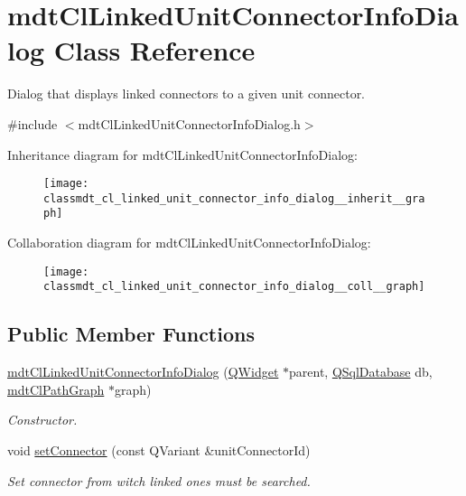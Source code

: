 \hypertarget{classmdt_cl_linked_unit_connector_info_dialog}{\section{mdt\-Cl\-Linked\-Unit\-Connector\-Info\-Dialog Class Reference}
\label{classmdt_cl_linked_unit_connector_info_dialog}
}


Dialog that displays linked connectors to a given unit connector.  




{\ttfamily \#include $<$mdt\-Cl\-Linked\-Unit\-Connector\-Info\-Dialog.\-h$>$}



Inheritance diagram for mdt\-Cl\-Linked\-Unit\-Connector\-Info\-Dialog\-:\nopagebreak
\begin{figure}[H]
\begin{center}
\leavevmode
\texttt{[image: classmdt\_cl\_linked\_unit\_connector\_info\_dialog\_\_inherit\_\_graph]}
\end{center}
\end{figure}


Collaboration diagram for mdt\-Cl\-Linked\-Unit\-Connector\-Info\-Dialog\-:\nopagebreak
\begin{figure}[H]
\begin{center}
\leavevmode
\texttt{[image: classmdt\_cl\_linked\_unit\_connector\_info\_dialog\_\_coll\_\_graph]}
\end{center}
\end{figure}
\subsection*{Public Member Functions}
\begin{DoxyCompactItemize}
\item 
\hyperlink{classmdt_cl_linked_unit_connector_info_dialog_a7dd1f529a45ba71b368cc8e7196662fb}{mdt\-Cl\-Linked\-Unit\-Connector\-Info\-Dialog} (\hyperlink{class_q_widget}{Q\-Widget} $\ast$parent, \hyperlink{class_q_sql_database}{Q\-Sql\-Database} db, \hyperlink{classmdt_cl_path_graph}{mdt\-Cl\-Path\-Graph} $\ast$graph)
\begin{DoxyCompactList}\small\item\em Constructor. \end{DoxyCompactList}\item 
void \hyperlink{classmdt_cl_linked_unit_connector_info_dialog_acb4919bd0d95c89b1c540a1e7f9c12a4}{set\-Connector} (const Q\-Variant \&unit\-Connector\-Id)
\begin{DoxyCompactList}\small\item\em Set connector from witch linked ones must be searched. \end{DoxyCompactList}\end{DoxyCompactItemize}


